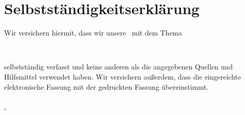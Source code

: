 
\newpage
\section*{Selbstständigkeitserklärung}
Wir versichern hiermit, dass wir unsere \mytexttype \ mit dem Thema
\begin{center}
\textbf{{\large \mytitle} \\ \mysubtitle}
\end{center}
selbstständig verfasst und keine anderen als die angegebenen Quellen und Hilfsmittel verwendet haben. Wir versichern außerdem, dass die eingereichte elektronische Fassung mit der gedruckten Fassung übereinstimmt.\\
\\
\vspace{15mm}
\noindent{}\mysubmissionplace , \mydate
\\
\begin{minipage}[t]{\textwidth}
\centering \dotfill \\
\myauthor
\end{minipage}